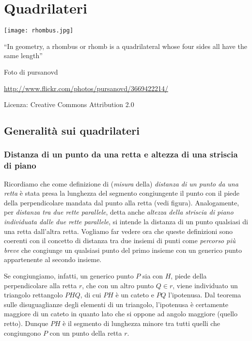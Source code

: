\chapter{Quadrilateri}

\texttt{[image: rhombus.jpg]}
  \begin{center}
    {\large ``In geometry, a rhombus or rhomb is a quadrilateral whose four sides all have the same length''}\par
    Foto di pursanovd\par
    \url{http://www.flickr.com/photos/pursanovd/3669422214/}\par
    Licenza: Creative Commons Attribution 2.0\par
  \end{center}
\newpage

\section{Generalità sui quadrilateri}

\subsection{Distanza di un punto da una retta e altezza di una striscia di piano}

Ricordiamo che come definizione di (\emph{misura} della) \emph{distanza di un punto da una retta} è stata presa la lunghezza del segmento congiungente il punto con il piede della perpendicolare mandata dal punto alla retta (vedi figura). Analogamente, per \emph{distanza tra due rette parallele}, detta anche \emph{altezza della striscia di piano individuata dalle due rette parallele}, si intende la distanza di un punto qualsiasi di una retta dall'altra retta. Vogliamo far vedere ora che queste definizioni sono coerenti con il concetto di distanza tra due insiemi di punti come \emph{percorso più breve} che congiunge un qualsiasi punto del primo insieme con un generico punto appartenente al secondo insieme.\vspace{5pt}

\noindent\begin{minipage}{0.65\textwidth}\parindent15pt
Se congiungiamo, infatti, un generico punto $P$ sia con $H$, piede della perpendicolare alla retta $r$, che con un altro punto $Q\in r$, viene individuato un triangolo rettangolo $PHQ$, di cui $PH$ è un cateto e $PQ$ l'ipotenusa. Dal teorema sulle disuguaglianze degli elementi di un triangolo, l'ipotenusa è certamente maggiore di un cateto in quanto lato che si oppone ad angolo maggiore (quello retto). Dunque $PH$ è il segmento di lunghezza minore tra tutti quelli che congiungono $P$ con un punto della retta $r$.
\end{minipage}\hfil
\begin{minipage}{0.35\textwidth}
\centering
\end{minipage}

